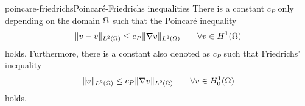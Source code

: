 \begin{Lemma*}{poincare-friedrichs}{Poincaré-Friedrichs inequalities}
  There is a constant $c_P$ only depending on the domain $\Omega$
  such that the Poincaré inequality
  \begin{gather}
    \lVert v-\overline v\rVert_{L^2(\Omega)} \le c_P \lVert\nabla v\rVert_{L^2(\Omega)}
    \qquad \forall v\in H^1(\Omega)
  \end{gather}
  holds. Furthermore, there is a constant also denoted as $c_P$ such that Friedrichs' inequality
  \begin{gather}
    \lVert v\rVert_{L^2(\Omega)} \le c_P \lVert\nabla v\rVert_{L^2(\Omega)}
    \qquad \forall v\in H^1_0(\Omega)
  \end{gather}
  holds.
\end{Lemma*}